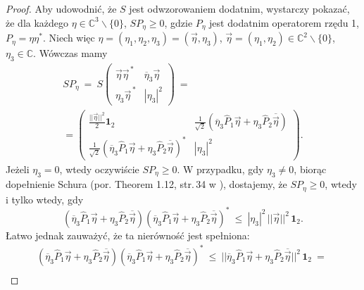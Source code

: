 {\begin{proof}
Aby udowodnić, że $S$ jest odwzorowaniem dodatnim,
wystarczy pokazać, że dla każdego $\eta \in \mathbb{C}^{3}\backslash\{0\}$,
$SP_{\eta} \geq 0$,
gdzie $P_{\eta}$ jest dodatnim operatorem rzędu 1,
$P_{\eta} = \eta \eta^{*}$.
Niech więc
$\eta = (\eta_{1}, \eta_{2}, \eta_{3}) = (\vec{\eta}, \eta_{3})$,
$\vec{\eta} = (\eta_{1}, \eta_{2}) \in \mathbb{C}^{2}\backslash\{0\}$,
$\eta_{3} \in \mathbb{C}$.
Wówczas mamy
\begin{multline}
 SP_{\eta} \:=\:  S \begin{pmatrix}
    \vec{\eta} \vec{\eta}^{\,*} & \overline{\eta}_{3} \vec{\eta} \\
    \eta_{3} \vec{\eta}^{\,*}   & |\eta_{3}|^{2}
 \end{pmatrix} \: = \: \\
 = \begin{pmatrix}
  \frac{||\vec{\eta}||^{2}}{2} \mathbf{1}_{2} &
        \frac{1}{\sqrt{2}} \left ( \overline{\eta}_{3} \hat{P}_{1} \vec{\eta} +
          \eta_{3} \hat{P}_{2} \overline{\vec{\eta}} \right) \\
\frac{1}{\sqrt{2}} \left ( \overline{\eta}_{3} \hat{P}_{1} \vec{\eta} +
          \eta_{3} \hat{P}_{2} \overline{\vec{\eta}} \right)^{*} &
        |\eta_{3}|^{2}
 \end{pmatrix}.
\end{multline}
Jeżeli $\eta_{3} = 0$, wtedy oczywiście $SP_{\eta} \geq 0$.
W przypadku, gdy $\eta_{3} \neq 0$,
biorąc dopełnienie Schura
(por. Theorem 1.12, str.\,34 w \cite{Zhang2006}),
dostajemy, że $SP_{\eta} \geq 0$, wtedy i tylko wtedy, gdy
\begin{equation}
\label{ieq:SchurForS}
   \left ( \overline{\eta}_{3} \hat{P}_{1} \vec{\eta} +
    \eta_{3} \hat{P}_{2} \overline{\vec{\eta}} \right)
   \left ( \overline{\eta}_{3} \hat{P}_{1} \vec{\eta} +
    \eta_{3} \hat{P}_{2} \overline{\vec{\eta}} \right)^{*}
    \: \leq \:
        |\eta_{3}|^{2} \, ||\vec{\eta}||^{2} \, \mathbf{1}_{2}.
\end{equation}
Łatwo jednak zauważyć, że ta nierówność jest spełniona:
\begin{multline}
   \left ( \overline{\eta}_{3} \hat{P}_{1} \vec{\eta} +
    \eta_{3} \hat{P}_{2} \overline{\vec{\eta}} \right)
   \left ( \overline{\eta}_{3} \hat{P}_{1} \vec{\eta} +
    \eta_{3} \hat{P}_{2} \overline{\vec{\eta}} \right)^{*} \: \leq \:
|| \overline{\eta}_{3} \hat{P}_{1} \vec{\eta} +
    \eta_{3} \hat{P}_{2}\overline{\vec{\eta}} ||^{2} \, \mathbf{1}_{2}
    \: = \: \\

\end{multline}
\end{proof}}
